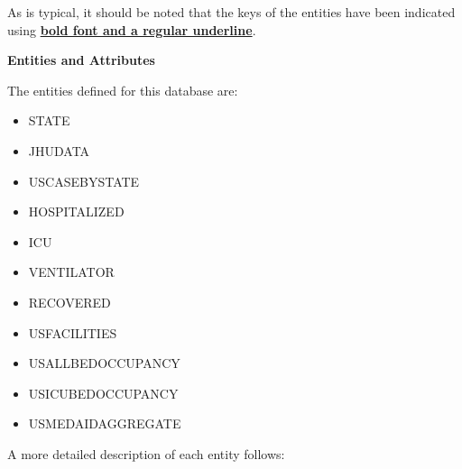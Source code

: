 \documentclass[11pt]{article}
\begin{document}
\noindent
As is typical, it should be noted that the keys of the entities have been indicated using \textbf{\underline{bold font and a regular underline}}.

\pagebreak

\noindent
\textbf{Entities and Attributes}

\noindent
The entities defined for this database are: \\

\begin{itemize}
    \item STATE
    \item JHUDATA
    \item USCASEBYSTATE
    \item HOSPITALIZED
    \item ICU
    \item VENTILATOR
    \item RECOVERED
    \item USFACILITIES
    \item USALLBEDOCCUPANCY
    \item USICUBEDOCCUPANCY
    \item USMEDAIDAGGREGATE
\end{itemize}

\noindent
A more detailed description of each entity follows:
\end{document}
